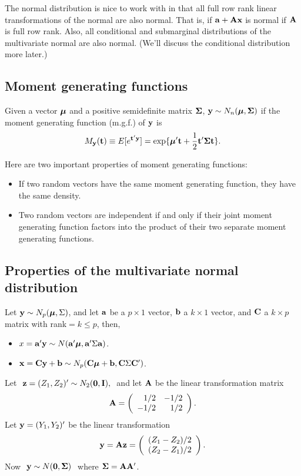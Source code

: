 The normal distribution is nice to work with in that
all full row rank linear transformations of the normal are
also normal. That is, if $\mathbf{a} + \mathbf{A} \mathbf{x}$ is normal if $\mathbf{A}$ is
full row rank. Also, all conditional and submarginal distributions
of the multivariate normal are also normal. (We'll discuss the
conditional distribution more later.)

\subsection{Moment generating functions}

Given a vector $\mbox{\boldmath $\mu$}$ and a positive
semidefinite matrix $\mathbf{\Sigma}$, $\mathbf{y} \sim N_n(\mbox{\boldmath $\mu$},\mathbf{\Sigma})$ if the moment generating function (m.g.f.) of $\mathbf{y}$ is
$$M_{\mathbf{y}}(\mathbf{t}) \equiv E[e^{\mathbf{t}'\mathbf{y}}] = \exp\{
	\mbox{\boldmath $\mu$}'\mathbf{t}+{1\over 2}\mathbf{t}'\mathbf{\Sigma}\mathbf{t} \}.$$

\vb
Here are two important properties of moment generating functions:
\begin{itemize}
\item  If two random vectors have the same moment generating function, they have the same density.
\item Two random vectors are independent if and only if their joint moment generating function factors into the product of their two separate moment generating functions.
\end{itemize}

\subsection{Properties of the multivariate normal distribution}

Let  $\mathbf{y} \sim N_p(\mbox{\boldmath $\mu$},\Sigma)$, and let $\bf a$ be a $p \times 1$ vector, $\mathbf{b}$ a $k \times 1$ vector, and  $\mathbf{C}$ a $k \times p$ matrix with rank$=k \le p$, then,
\begin{itemize}
\item $x =  \mathbf{a}'\mathbf{y}  \sim N(\mathbf{a}'\mbox{\boldmath $\mu$},\mathbf{a}'\Sigma\mathbf{a})$.

\vb
\item $\mathbf{x} =  \mathbf{C}\mathbf{y} + \mathbf{b} \sim N_p(\mathbf{C}\mbox{\boldmath $\mu$} +\mathbf{b},\mathbf{C}\Sigma\mathbf{C}')$.
\end{itemize}


\bexa
Let $\ \mathbf{z}=(Z_1,Z_2)' \sim N_2(\bf0,\mathbf{I}),\ $ and let $\mathbf{A}$ be the
linear transformation matrix
$$\mathbf{A}=\left(\begin{array}{rr}1/2&-1/2\\-1/2&1/2\end{array}\right).$$
Let $\mathbf{y}=(Y_1,Y_2)'$ be the linear transformation
$$\mathbf{y}=\mathbf{A}\mathbf{z}=
	\left(\begin{array}{c}(Z_1-Z_2)/2\\(Z_2-Z_1)/2\end{array}\right).$$
Now $\ \mathbf{y} \sim N({\bf 0},\mathbf{\Sigma})\ $ where
$\mathbf{\Sigma}=\mathbf{A}\mathbf{A}'$.
\eexa



